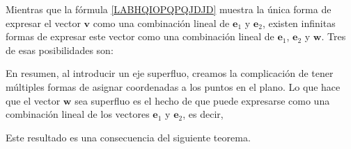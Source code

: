 \newpage
{}
Mientras que la fórmula \eqref{LABHQIOPQPQJDJD} muestra la única forma de expresar el vector $\mathbf{v}$ como una combinación lineal de $\mathbf{e}_1$ y $\mathbf{e}_2$, existen infinitas formas de expresar este vector como una combinación lineal de $\mathbf{e}_1$, $\mathbf{e}_2$ y $\mathbf{w}$. Tres de esas posibilidades son:
\begin{matrizn}
\end{matrizn}
En resumen, al introducir un eje superfluo, creamos la complicación de tener múltiples formas de asignar coordenadas a los puntos en el plano. Lo que hace que el vector $\mathbf{w}$ sea superfluo es el hecho de que puede expresarse como una combinación lineal de los vectores $\mathbf{e}_1$ y $\mathbf{e}_2$, es decir,
\begin{matrizn}
\end{matrizn}
Este resultado es una consecuencia del siguiente teorema.

